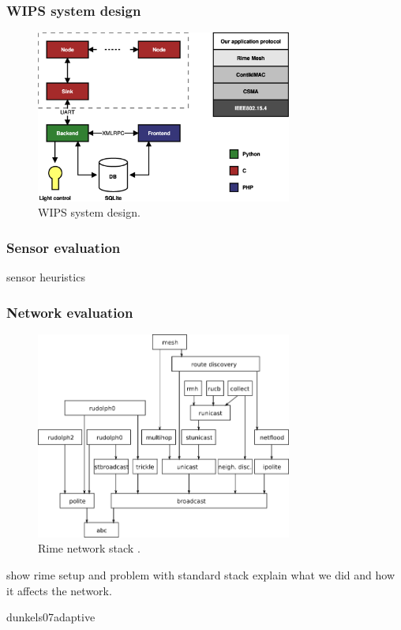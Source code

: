 \documentclass{beamer}
\begin{document}
\begin{frame}
\frametitle{WIPS system design}

	\begin{center}
		\begin{figure}
			\includegraphics[width=0.75\textwidth]{design.eps}
			\caption{WIPS system design.}
		\end{figure}
	\end{center}

\end{frame}


\begin{frame}
\frametitle{Sensor evaluation}

sensor heuristics

\end{frame}

\begin{frame}
\frametitle{Network evaluation}

	\begin{center}
		\begin{figure}
			\includegraphics[width=0.75\textwidth]{rime.png}
			\caption{Rime network stack \cite{rime}.}
		\end{figure}
	\end{center}

	show rime setup and problem with standard stack explain what we did and how it 	affects the network.
	
	dunkels07adaptive


\end{frame}
\end{document}
